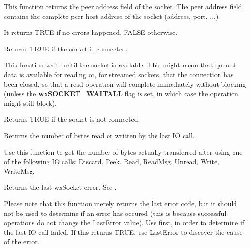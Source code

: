 
This function returns the peer address field of the socket. The peer 
address field contains the complete peer host address of the socket
(address, port, ...).


It returns TRUE if no errors happened, FALSE otherwise.

%
%
\label{wxsocketbaseisconnected}


Returns TRUE if the socket is connected.

%
%
\label{wxsocketbaseisdata}


This function waits until the socket is readable. This might mean that
queued data is available for reading or, for streamed sockets, that
the connection has been closed, so that a read operation will complete
immediately without blocking (unless the {\bf wxSOCKET\_WAITALL} flag
is set, in which case the operation might still block).

\label{wxsocketbaseisdisconnected}

%
%

Returns TRUE if the socket is not connected.

\label{wxsocketbaselastcount}

%
%

Returns the number of bytes read or written by the last IO call.

Use this function to get the number of bytes actually transferred
after using one of the following IO calls: Discard, Peek, Read,
ReadMsg, Unread, Write, WriteMsg.

%
%
\label{wxsocketbaselasterror}


Returns the last wxSocket error. See .

Please note that this function merely returns the last error code,
but it should not be used to determine if an error has occured (this
is because successful operations do not change the LastError value).
Use  first, in order to determine
if the last IO call failed. If this returns TRUE, use LastError
to discover the cause of the error.

